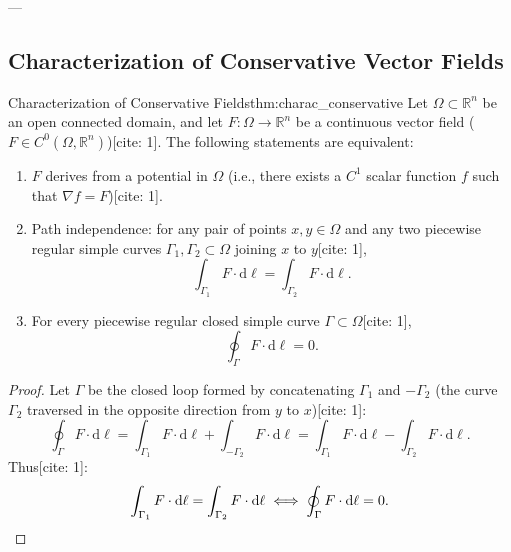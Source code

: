 ---

\subsection{Characterization of Conservative Vector Fields}

\begin{theoreme}{Characterization of Conservative Fields}{thm:charac_conservative}
Let $\Omega \subset \mathbb{R}^n$ be an open connected domain, and let $F \colon \Omega \to \mathbb{R}^n$ be a continuous vector field ($F \in C^0(\Omega, \mathbb{R}^n)$)[cite: 1]. The following statements are equivalent:
\begin{enumerate}
    \item $F$ derives from a potential in $\Omega$ (i.e., there exists a $C^1$ scalar function $f$ such that $\nabla f = F$)[cite: 1].
    \item Path independence: for any pair of points $x, y \in \Omega$ and any two piecewise regular simple curves $\Gamma_1, \Gamma_2 \subset \Omega$ joining $x$ to $y$[cite: 1],
    \[
    \int_{\Gamma_1} F \cdot \mathrm{d}\ell = \int_{\Gamma_2} F \cdot \mathrm{d}\ell.
    \]
    \item For every piecewise regular closed simple curve $\Gamma \subset \Omega$[cite: 1],
    \[
    \oint_{\Gamma} F \cdot \mathrm{d}\ell = 0.
    \]
\end{enumerate}
\end{theoreme}

\begin{proof}
Let $\Gamma$ be the closed loop formed by concatenating $\Gamma_1$ and $-\Gamma_2$ (the curve $\Gamma_2$ traversed in the opposite direction from $y$ to $x$)[cite: 1]:
\[
\oint_{\Gamma} F \cdot \mathrm{d}\ell = \int_{\Gamma_1} F \cdot \mathrm{d}\ell + \int_{-\Gamma_2} F \cdot \mathrm{d}\ell = \int_{\Gamma_1} F \cdot \mathrm{d}\ell - \int_{\Gamma_2} F \cdot \mathrm{d}\ell.
\]
Thus[cite: 1]:
\[
\int_{\Gamma_1} F \cdot \mathrm{d}\ell = \int_{\Gamma_2} F \cdot \mathrm{d}\ell \iff \oint_{\Gamma} F \cdot \mathrm{d}\ell = 0. \qedhere
\]
\end{proof}

\begin{center}
\end{center}

